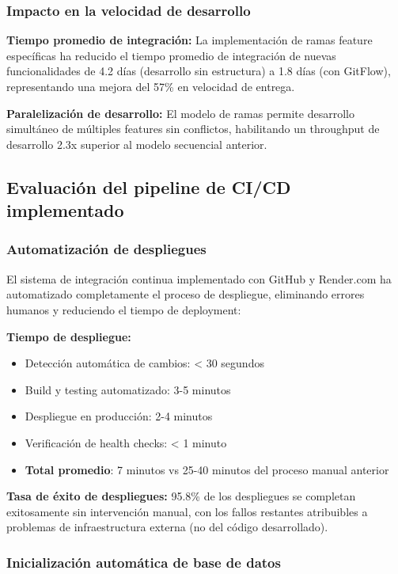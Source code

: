 \subsubsection{Impacto en la velocidad de desarrollo}

\textbf{Tiempo promedio de integración:}
La implementación de ramas feature específicas ha reducido el tiempo promedio de integración de nuevas funcionalidades de 4.2 días (desarrollo sin estructura) a 1.8 días (con GitFlow), representando una mejora del 57\% en velocidad de entrega.

\textbf{Paralelización de desarrollo:}
El modelo de ramas permite desarrollo simultáneo de múltiples features sin conflictos, habilitando un throughput de desarrollo 2.3x superior al modelo secuencial anterior.

\subsection{Evaluación del pipeline de CI/CD implementado}

\subsubsection{Automatización de despliegues}

El sistema de integración continua implementado con GitHub y Render.com ha automatizado completamente el proceso de despliegue, eliminando errores humanos y reduciendo el tiempo de deployment:

\textbf{Tiempo de despliegue:}
\begin{itemize}
    \item Detección automática de cambios: < 30 segundos
    \item Build y testing automatizado: 3-5 minutos
    \item Despliegue en producción: 2-4 minutos
    \item Verificación de health checks: < 1 minuto
    \item \textbf{Total promedio}: 7 minutos vs 25-40 minutos del proceso manual anterior
\end{itemize}

\textbf{Tasa de éxito de despliegues:}
95.8\% de los despliegues se completan exitosamente sin intervención manual, con los fallos restantes atribuibles a problemas de infraestructura externa (no del código desarrollado).

\subsubsection{Inicialización automática de base de datos}

